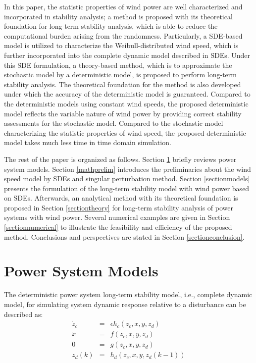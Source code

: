\documentclass[journal]{IEEEtran}
\newcommand{\ee}{\epsilon}
\begin{document}
In this paper, the statistic properties of wind power are well characterized and incorporated in stability analysis; a method is proposed with its theoretical foundation for long-term stability analysis, which is able to reduce the computational burden arising from the randomness. Particularly, a SDE-based model \cite{Milano:2013_1} is utilized to characterize the Weibull-distributed wind speed, which is further incorporated into the complete dynamic model described in SDEs. Under this SDE formulation, a theory-based method, which is to approximate the stochastic model by a deterministic model, is proposed to perform long-term stability analysis. The theoretical foundation for the method is also developed under which the accuracy of the deterministic model is guaranteed. Compared to the deterministic models using constant wind speeds, the proposed deterministic model reflects the variable nature of wind power by providing correct stability assessments for the stochastic model. Compared to the stochastic model characterizing the statistic properties of wind speed, the proposed deterministic model takes much less time in time domain simulation.












The rest of the paper is organized as follows. Section \ref{sectionpowermodels} briefly reviews power system models. Section \ref{mathprelim} introduces the preliminaries about the wind speed model by SDEs and singular perturbation method. Section \ref{sectionmodels} presents the formulation of the long-term stability model with wind power based on SDEs. Afterwards, an analytical method with its theoretical foundation is proposed in Section \ref{sectiontheory} for long-term stability analysis of power systems with wind power. Several numerical examples are given in Section \ref{sectionnumerical} to illustrate the feasibility and efficiency of the proposed method. Conclusions and perspectives are stated in Section \ref{sectionconclusion}.






\section{Power System Models}\label{sectionpowermodels}
The deterministic power system long-term stability model, i.e., complete dynamic model, for simulating system dynamic response relative to a disturbance can be described as:
\begin{eqnarray}
\dot{z}_{c}&=&\ee{h}_c({z_c,x,y,z_d})\label{slow ode}\\
\dot{{x}}&=&{f}({z_c,x,y,z_d})\label{fast ode}\\
{0}&=&{g}({z_c,x,y,z_d})\label{algebraic eqn}\\
{z}_d(k)&=&{h}_d({z_c,x,y,z_d(k-1)})\label{slow dde}
\end{eqnarray}
\end{document}
